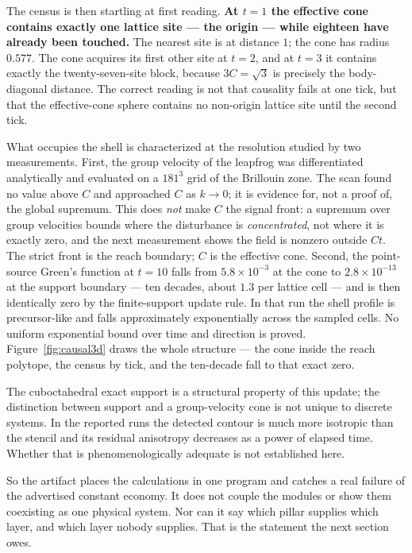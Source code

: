 \documentclass[11pt,a4paper]{article}
\theoremstyle{definition}
\theoremstyle{plain}
\theoremstyle{remark}
\begin{document}
The census is then startling at first reading. \textbf{At $t=1$ the
effective cone contains exactly one lattice site --- the origin --- while eighteen
have already been touched.} The nearest site is at distance $1$; the cone
has radius $0.577$. The cone acquires its first other site at $t=2$, and
at $t=3$ it contains exactly the twenty-seven-site block, because
$3C = \sqrt3$ is precisely the body-diagonal distance. The correct reading
is not that causality fails at one tick, but that the effective-cone sphere
contains no non-origin lattice site until the second tick.

What occupies the shell is characterized at the resolution studied by two
measurements. First, the group velocity of the leapfrog was differentiated
analytically and evaluated on a $181^3$ grid of the Brillouin zone. The
scan found no value above $C$ and approached $C$ as $k\to0$; it is evidence
for, not a proof of, the global supremum. This does \emph{not} make $C$ the
signal front: a supremum over group velocities bounds where the
disturbance is \emph{concentrated}, not where it is exactly zero, and the
next measurement shows the field is nonzero outside $Ct$. The strict
front is the reach boundary; $C$ is the effective cone. Second, the
point-source Green's function at
$t=10$ falls from $5.8\times10^{-3}$ at the cone to $2.8\times10^{-13}$ at
the support boundary --- ten decades, about $1.3$ per lattice cell --- and
is then identically zero by the finite-support update rule. In that run the
shell profile is precursor-like and falls approximately exponentially
across the sampled cells. No uniform exponential bound over time and
direction is proved.
Figure~\ref{fig:causal3d} draws the whole structure --- the cone inside
the reach polytope, the census by tick, and the ten-decade fall to that
exact zero.

The cuboctahedral exact support is a structural property of this update;
the distinction between support and a group-velocity cone is not unique to
discrete systems. In the reported runs the detected contour is much more
isotropic than the stencil and its residual anisotropy decreases as a
power of elapsed time. Whether that is phenomenologically adequate is not
established here.

So the artifact places the calculations in one program and catches a real
failure of the advertised constant economy. It does not couple the modules
or show them coexisting as one physical system. Nor can it say which
pillar supplies which layer, and which layer nobody supplies. That is the
statement the next section owes.
\end{document}
